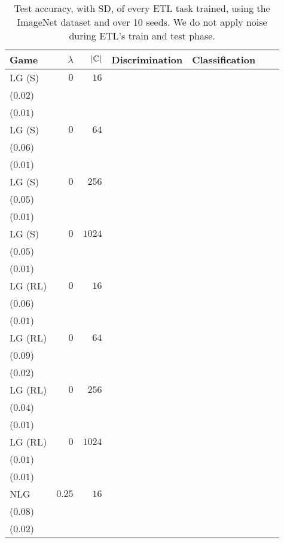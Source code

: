 \begin{table*}[t]
\linespread{0.6}\selectfont\centering
\centering
\caption{Test accuracy, with SD, of every ETL task trained, using the ImageNet dataset and over 10 seeds. We do not apply noise during ETL's train and test phase.}
\label{table:etl_imagenet_0_eval}
\begin{tabular}{lrrrrrr}
\toprule
Game & \(\lambda\) & \(|\mathcal{{\mathbb{C}}}|\) & \multicolumn{1}{c}{Discrimination} & \multicolumn{1}{c}{Classification} \\[1ex]
\midrule
LG {\scriptsize(S)} & \(0\) & \(16\) & \longcell{\(0.23\)\\{\tiny(\(0.02\))}} & \longcell{\(0.08\)\\{\tiny(\(0.01\))}} \\[2.2ex]
LG {\scriptsize(S)} & \(0\) & \(64\) & \longcell{\(0.33\)\\{\tiny(\(0.06\))}} & \longcell{\(0.11\)\\{\tiny(\(0.01\))}} \\[2.2ex]
LG {\scriptsize(S)} & \(0\) & \(256\) & \longcell{\(0.44\)\\{\tiny(\(0.05\))}} & \longcell{\(0.13\)\\{\tiny(\(0.01\))}} \\[2.2ex]
LG {\scriptsize(S)} & \(0\) & \(1024\) & \longcell{\(0.58\)\\{\tiny(\(0.05\))}} & \longcell{\(0.14\)\\{\tiny(\(0.01\))}} \\[2.2ex]
LG {\scriptsize(RL)} & \(0\) & \(16\) & \longcell{\(0.37\)\\{\tiny(\(0.06\))}} & \longcell{\(0.07\)\\{\tiny(\(0.01\))}} \\[2.2ex]
LG {\scriptsize(RL)} & \(0\) & \(64\) & \longcell{\(0.64\)\\{\tiny(\(0.09\))}} & \longcell{\(0.11\)\\{\tiny(\(0.02\))}} \\[2.2ex]
LG {\scriptsize(RL)} & \(0\) & \(256\) & \longcell{\(0.80\)\\{\tiny(\(0.04\))}} & \longcell{\(0.13\)\\{\tiny(\(0.01\))}} \\[2.2ex]
LG {\scriptsize(RL)} & \(0\) & \(1024\) & \longcell{\(0.88\)\\{\tiny(\(0.01\))}} & \longcell{\(0.14\)\\{\tiny(\(0.01\))}} \\[2.2ex]
NLG & \(0.25\) & \(16\) & \longcell{\(0.37\)\\{\tiny(\(0.08\))}} & \longcell{\(0.08\)\\{\tiny(\(0.02\))}} \\[2.2ex]

\end{tabular}
\end{table*}
